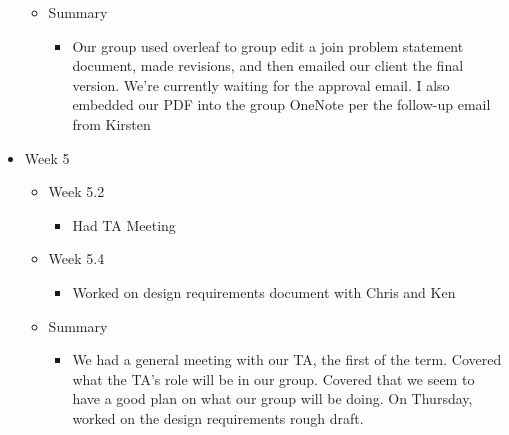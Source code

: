 \begin{itemize}
\begin{itemize}
    \item Summary
      \begin{itemize}
      \item Our group used overleaf to group edit a join problem statement document, made revisions, and then emailed our client the final version. We're currently waiting for the approval email. I also embedded our PDF into the group OneNote per the follow-up email from Kirsten 
      \end{itemize}
	\end{itemize}

\item Week 5
	\begin{itemize}
	\item Week 5.2
      \begin{itemize}
      \item Had TA Meeting
      \end{itemize}
	\item Week 5.4
      \begin{itemize}
      \item Worked on design requirements document with Chris and Ken 
      \end{itemize}
    
    \item Summary
      \begin{itemize}
      \item We had a general meeting with our TA, the first of the term. Covered what the TA's role will be in our group. Covered that we seem to have a good plan on what our group will be doing. On Thursday, worked on the design requirements rough draft.  
      \end{itemize}
	\end{itemize}


\end{itemize}
